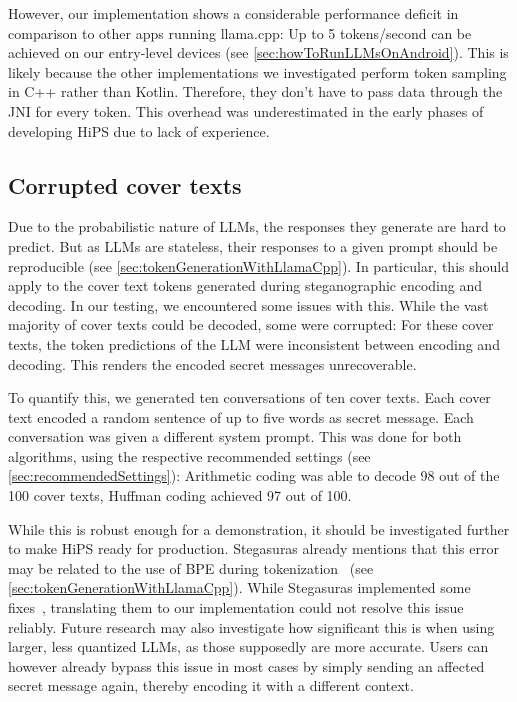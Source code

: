 However, our implementation shows a considerable performance deficit in comparison to other apps running llama.cpp: Up to 5 tokens/second can be achieved on our entry-level devices (see \cref{sec:howToRunLLMsOnAndroid}). This is likely because the other implementations we investigated perform token sampling in C++ rather than Kotlin. Therefore, they don't have to pass data through the \gls{JNI} for every token. This overhead was underestimated in the early phases of developing \gls{HiPS} due to lack of experience.

\subsection{Corrupted cover texts}
\label{sec:corruptedCoverTexts}
Due to the probabilistic nature of \glspl{LLM}, the responses they generate are hard to predict. But as \glspl{LLM} are stateless, their responses to a given prompt should be reproducible (see \cref{sec:tokenGenerationWithLlamaCpp}). In particular, this should apply to the cover text tokens generated during steganographic encoding and decoding. In our testing, we encountered some issues with this. While the vast majority of cover texts could be decoded, some were corrupted: For these cover texts, the token predictions of the \gls{LLM} were inconsistent between encoding and decoding. This renders the encoded secret messages unrecoverable.

To quantify this, we generated ten conversations of ten cover texts. Each cover text encoded a random sentence of up to five words as secret message. Each conversation was given a different system prompt. This was done for both algorithms, using the respective recommended settings (see \cref{sec:recommendedSettings}): Arithmetic coding was able to decode 98 out of the 100 cover texts, Huffman coding achieved 97 out of 100.

While this is robust enough for a demonstration, it should be investigated further to make \gls{HiPS} ready for production. Stegasuras already mentions that this error may be related to the use of \gls{BPE} during tokenization~\cite{zieglerStegasuras2025,zieglerHarvardnlpNeuralSteganography2025} (see \cref{sec:tokenGenerationWithLlamaCpp}). While Stegasuras implemented some fixes~\cite{zieglerHarvardnlpNeuralSteganography2025}, translating them to our implementation could not resolve this issue reliably. Future research may also investigate how significant this is when using larger, less quantized \glspl{LLM}, as those supposedly are more accurate. Users can however already bypass this issue in most cases by simply sending an affected secret message again, thereby encoding it with a different context.

